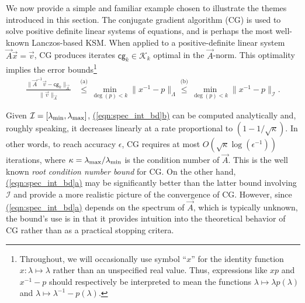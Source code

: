 We now provide a simple and familiar example chosen to illustrate the themes introduced in this section.
The conjugate gradient algorithm (CG) \cite{hestenes_stiefel_52} is used to solve positive definite linear systems of equations, and is perhaps the most well-known Lanczos-based KSM.
When applied to a positive-definite linear system \( \vec{A} \vec{x} = \vec{v} \), CG produces iterates \( \textsf{cg}_k\in\mathcal{K}_k \) optimal in the \( \vec{A} \)-norm.
This optimality implies the error bounds\footnote{Throughout, we will occasionally use symbol ``\( x \)'' for the identity function \( x: \lambda\mapsto \lambda \) rather than an unspecified real value. Thus, expressions  like \( x p \) and \( x^{-1} - p \) should respectively be interpreted to mean the functions \( \lambda\mapsto \lambda p(\lambda) \) and \( \lambda\mapsto \lambda^{-1} - p(\lambda) \).}
\begin{align}
    \frac{\| \vec{A}^{-1} \vec{v} - \textsf{cg}_k \|_{\vec{A}}}{\| \vec{v} \|_{\vec{A}}}
    &\stackrel{\text{(a)}}{\leq} \min_{\deg(p)<k} \| x^{-1} - p \|_{\Lambda} %
    \stackrel{\text{(b)}}{\leq} \min_{\deg(p)<k} \| x^{-1} - p \|_{\mathcal{I}}. \label{eqn:spec_int_bd}
\end{align}

Given \( \mathcal{I} = [\lambda_{\textup{min}},\lambda_{\textup{max}}] \), \href{eqn:spec_int_bd}{(\ref{eqn:spec_int_bd}b)} can be computed analytically and, roughly speaking, it decreases linearly at a rate proportional to \( (1 - 1/\sqrt{\kappa}) \). 
In other words, to reach accuracy \( \epsilon \), CG requires at most \( O(\sqrt{\kappa}\log(\epsilon^{-1})) \) iterations, where \( \kappa = \lambda_{\textup{max}} / \lambda_{\textup{min}} \) is the condition number of \( \vec{A} \).
This is the well known \emph{root condition number bound} for CG.
On the other hand, \href{eqn:spec_int_bd}{(\ref{eqn:spec_int_bd}a)} may be significantly better than the latter bound involving \( \mathcal{I} \) and provide a more realistic picture of the convergence of CG.
However, since \href{eqn:spec_int_bd}{(\ref{eqn:spec_int_bd}a)} depends on the spectrum of \( \vec{A} \), which is typically unknown, the bound's use is in that it provides intuition into the theoretical behavior of CG rather than as a practical stopping critera.

